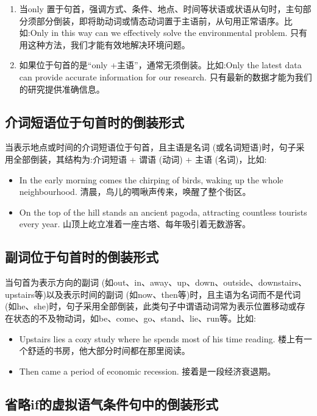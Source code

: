 \begin{enumerate}
  \item 当only 置于句首，强调方式、条件、地点、时间等状语或状语从句时，主句部分须部分倒装，即将助动词或情态动词置于主语前，从句用正常语序。比如:Only in this way can we effectively solve the environmental problem. 只有用这种方法，我们才能有效地解决环境问题。
  \item 如果位于句首的是“only +主语”，通常无须倒装。比如:Only the latest data can provide accurate information for our research. 只有最新的数据才能为我们的研究提供准确信息。
\end{enumerate}

\subsection{介词短语位于句首时的倒装形式}

当表示地点或时间的介词短语位于句首，且主语是名词 (或名词短语)时，句子采用全部倒装，其结构为:介词短语 + 谓语 (动词) + 主语 (名词)，比如:
\begin{itemize}
  \item In the early morning comes the chirping of birds, waking up the whole neighbourhood. 清晨，鸟儿的啁啾声传来，唤醒了整个街区。
  \item On the top of the hill stands an ancient pagoda, attracting countless tourists every year. 山顶上屹立准着一座古塔、每年吸引着无数游客。
\end{itemize}

\subsection{副词位于句首时的倒装形式}

当句首为表示方向的副词 (如out、in、away、up、down、outside、downstairs、upstairs等)以及表示时间的副词 (如now、then等)时，且主语为名词而不是代词 (如he、she)时，句子采用全部倒装，此类句子中谓语动词常为表示位置移动或存在状态的不及物动词，如be、come、go、stand、lie、run等。比如:
\begin{itemize}
  \item Upstairs lies a cozy study where he spends most of his time reading. 楼上有一个舒适的书房，他大部分时间都在那里阅读。
  \item Then came a period of economic recession. 接着是一段经济衰退期。
\end{itemize}

\subsection{省略if的虚拟语气条件句中的倒装形式}

